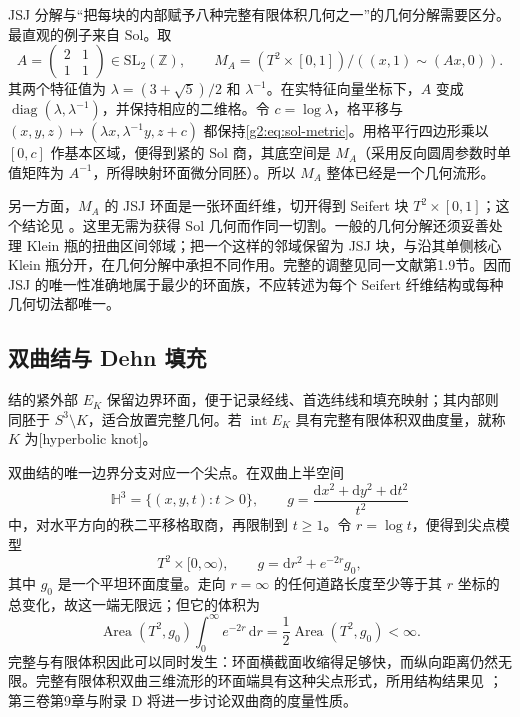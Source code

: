 \ProseParagraphBreak

JSJ 分解与“把每块的内部赋予八种完整有限体积几何之一”的几何分解需要区分。最直观的例子来自 \(\mathrm{Sol}\)。取
\[
	A=\begin{pmatrix}2&1\\1&1\end{pmatrix}\in\mathrm{SL}_2(\mathbb Z),\qquad
	M_A=(T^2\times[0,1])/((x,1)\sim(Ax,0)).
\]
其两个特征值为 \(\lambda=(3+\sqrt5)/2\) 和 \(\lambda^{-1}\)。在实特征向量坐标下，\(A\) 变成 \(\operatorname{diag}(\lambda,\lambda^{-1})\)，并保持相应的二维格。令 \(c=\log\lambda\)，格平移与 \((x,y,z)\mapsto(\lambda x,\lambda^{-1}y,z+c)\) 都保持\eqref{g2:eq:sol-metric}。用格平行四边形乘以 \([0,c]\) 作基本区域，便得到紧的 \(\mathrm{Sol}\) 商，其底空间是 \(M_A\)（采用反向圆周参数时单值矩阵为 \(A^{-1}\)，所得映射环面微分同胚）。所以 \(M_A\) 整体已经是一个几何流形。

\ProseParagraphBreak

另一方面，\(M_A\) 的 JSJ 环面是一张环面纤维，切开得到 Seifert 块 \(T^2\times[0,1]\)；这个结论见 \cite[第1.9节]{AschenbrennerFriedlWilton2015}。这里无需为获得 \(\mathrm{Sol}\) 几何而作同一切割。一般的几何分解还须妥善处理 Klein 瓶的扭曲区间邻域；把一个这样的邻域保留为 JSJ 块，与沿其单侧核心 Klein 瓶分开，在几何分解中承担不同作用。完整的调整见同一文献第1.9节。因而 JSJ 的唯一性准确地属于最少的环面族，不应转述为每个 Seifert 纤维结构或每种几何切法都唯一。

\subsection{双曲结与 Dehn 填充}
\label{g2:subsec:A04:05}

结的紧外部 \(E_K\) 保留边界环面，便于记录经线、首选纬线和填充映射；其内部则同胚于 \(S^3\setminus K\)，适合放置完整几何。若 \(\operatorname{int}E_K\) 具有完整有限体积双曲度量，就称 \(K\) 为[hyperbolic knot]。

\ProseParagraphBreak

双曲结的唯一边界分支对应一个尖点。在双曲上半空间
\[
	\mathbb H^3=\{(x,y,t):t>0\},\qquad
	g=\frac{\mathrm{d}x^2+\mathrm{d}y^2+\mathrm{d}t^2}{t^2}
\]
中，对水平方向的秩二平移格取商，再限制到 \(t\ge1\)。令 \(r=\log t\)，便得到尖点模型
\begin{equation}\label{g2:eq:hyperbolic-torus-cusp}
	T^2\times[0,\infty),\qquad g=\mathrm{d}r^2+e^{-2r}g_0,
\end{equation}
其中 \(g_0\) 是一个平坦环面度量。走向 \(r=\infty\) 的任何道路长度至少等于其 \(r\) 坐标的总变化，故这一端无限远；但它的体积为
\[
	\operatorname{Area}(T^2,g_0)\int_0^\infty e^{-2r}\,\mathrm{d}r
	=\frac12\operatorname{Area}(T^2,g_0)<\infty.
\]
完整与有限体积因此可以同时发生：环面横截面收缩得足够快，而纵向距离仍然无限。完整有限体积双曲三维流形的环面端具有这种尖点形式，所用结构结果见 \cite[第1.7节]{AschenbrennerFriedlWilton2015}；第三卷第9章与附录 D 将进一步讨论双曲商的度量性质。

